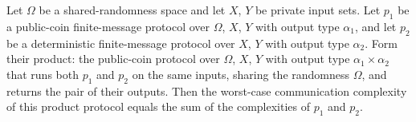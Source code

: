 \begin{theorem}
\label{CommunicationComplexity.PublicCoin.FiniteMessage.Protocol.prodDet_complexity}
\leanok
{}
Let $\Omega$ be a shared-randomness space and let $X$, $Y$ be private input sets. Let
$p_1$ be a public-coin finite-message protocol over $\Omega$, $X$, $Y$ with output type
$\alpha_1$, and let $p_2$ be a deterministic finite-message protocol over $X$, $Y$ with
output type $\alpha_2$. Form their product: the public-coin protocol over $\Omega$, $X$,
$Y$ with output type $\alpha_1 \times \alpha_2$ that runs both $p_1$ and $p_2$ on the
same inputs, sharing the randomness $\Omega$, and returns the pair of their outputs.
Then the worst-case communication complexity of this product protocol equals the sum of
the complexities of $p_1$ and $p_2$.
\end{theorem}
